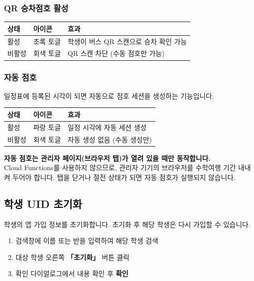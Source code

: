 \documentclass[a4paper,11pt]{article}
\begin{document}
\subsubsection{QR 승차점호 활성}

\begin{center}
\begin{tabular}{@{}lll@{}}
  \toprule
  \textbf{상태} & \textbf{아이콘} & \textbf{효과} \\
  \midrule
  활성 & 초록 토글 & 학생이 버스 QR 스캔으로 승차 확인 가능 \\
  비활성 & 회색 토글 & QR 스캔 차단 (수동 점호만 가능) \\
  \bottomrule
\end{tabular}
\end{center}

\subsubsection{자동 점호}

일정표에 등록된 시각이 되면 자동으로 점호 세션을 생성하는 기능입니다.

\begin{center}
\begin{tabular}{@{}lll@{}}
  \toprule
  \textbf{상태} & \textbf{아이콘} & \textbf{효과} \\
  \midrule
  활성 & 파랑 토글 & 일정 시각에 자동 세션 생성 \\
  비활성 & 회색 토글 & 자동 생성 없음 (수동 생성만) \\
  \bottomrule
\end{tabular}
\end{center}

\begin{tcolorbox}[warnbox]
\textbf{자동 점호는 관리자 페이지(브라우저 탭)가 열려 있을 때만 동작합니다.}\\
Cloud Functions를 사용하지 않으므로, 관리자 기기의 브라우저를 수학여행 기간 내내 켜 두어야 합니다.
탭을 닫거나 절전 상태가 되면 자동 점호가 실행되지 않습니다.
\end{tcolorbox}

\subsection{학생 UID 초기화}

학생의 앱 가입 정보를 초기화합니다. 초기화 후 해당 학생은 다시 가입할 수 있습니다.

\begin{tcolorbox}[stepbox]
\begin{enumerate}
  \item 검색창에 이름 또는 반을 입력하여 해당 학생 검색
  \item 대상 학생 오른쪽 \textbf{「초기화」} 버튼 클릭
  \item 확인 다이얼로그에서 내용 확인 후 \textbf{확인}
\end{enumerate}
\end{tcolorbox}
\end{document}
